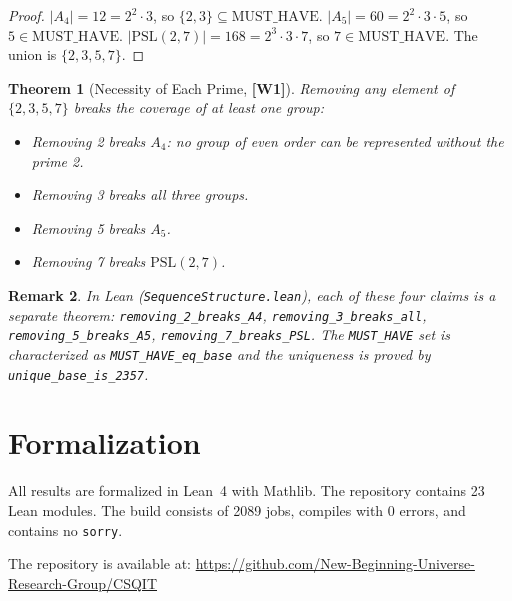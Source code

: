 ﻿\documentclass[11pt]{article}
\newcommand{\wone}[1]{\textcolor{wcolor}{\textbf{[#1]}}}
\newtheorem{theorem}{Theorem}
\newtheorem{remark}[theorem]{Remark}
\begin{document}
\begin{proof}
$|A_4| = 12 = 2^2 \cdot 3$, so $\{2, 3\} \subseteq
\mathrm{MUST\_HAVE}$.
$|A_5| = 60 = 2^2 \cdot 3 \cdot 5$, so $5 \in
\mathrm{MUST\_HAVE}$.
$|\mathrm{PSL}(2,7)| = 168 = 2^3 \cdot 3 \cdot 7$, so
$7 \in \mathrm{MUST\_HAVE}$.
The union is $\{2, 3, 5, 7\}$.
\end{proof}

\begin{theorem}[Necessity of Each Prime, \wone{W1}]
\label{thm:necessity}
Removing any element of $\{2, 3, 5, 7\}$ breaks the coverage
of at least one group:
\begin{itemize}
\item Removing 2 breaks $A_4$: no group of even order can
  be represented without the prime 2.
\item Removing 3 breaks all three groups.
\item Removing 5 breaks $A_5$.
\item Removing 7 breaks $\mathrm{PSL}(2,7)$.
\end{itemize}
\end{theorem}

\begin{remark}
In Lean (\texttt{SequenceStructure.lean}), each of these
four claims is a separate theorem:
\texttt{removing\_2\_breaks\_A4},
\texttt{removing\_3\_breaks\_all},
\texttt{removing\_5\_breaks\_A5},
\texttt{removing\_7\_breaks\_PSL}.
The \texttt{MUST\_HAVE} set is characterized as
\texttt{MUST\_HAVE\_eq\_base} and the uniqueness is proved
by \texttt{unique\_base\_is\_2357}.
\end{remark}

\section{Formalization}
\label{sec:formalization}

All results are formalized in Lean~4 with Mathlib. The
repository contains 23 Lean modules. The build consists
of 2089 jobs, compiles with 0 errors, and contains no
\texttt{sorry}.

The repository is available at:
\url{https://github.com/New-Beginning-Universe-Research-Group/CSQIT}
\end{document}
